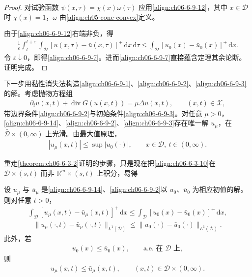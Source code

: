 \documentclass[../../main.tex]{subfiles}
\begin{document}
\begin{proof}
对试验函数 $\psi(x,\tau)=\chi(x)\omega(\tau)$ 应用\eqref{align:ch06-6-9-12}，其中 $x\in\mathscr{D}$ 时 $\chi(x)=1$，$\omega$ 由\eqref{align:ch05-cone-convex}定义。

由于\eqref{align:ch06-6-9-12}右端非负，得
\begin{align}
\frac{1}{\varepsilon}\int_{t}^{t+\varepsilon}\int_{\mathscr{D}}[u(x,\tau)-\bar{u}(x,\tau)]^{+}\,\mathrm{d}x\,\mathrm{d}\tau\leqslant\int_{\mathscr{D}}[u_{0}(x)-\bar{u}_{0}(x)]^{+}\,\mathrm{d}x.
\label{align:ch06-6-9-13}
\end{align}
令 $\varepsilon\downarrow 0$，即得\eqref{align:ch06-6-9-7}。进而\eqref{align:ch06-6-9-7}直接蕴含定理其余论断。证明完成。
\end{proof}

下一步用黏性消失法构造\eqref{align:ch06-6-9-1}、\eqref{align:ch06-6-9-2}、\eqref{align:ch06-6-9-3}的解。考虑抛物方程组
\begin{align}
\partial_{t}u(x,t)+\operatorname{div}G(u(x,t))=\mu\Delta u(x,t),\qquad (x,t)\in\mathscr{X},
\label{align:ch06-6-9-14}
\end{align}
带边界条件\eqref{align:ch06-6-9-2}与初始条件\eqref{align:ch06-6-9-3}。对任意 $\mu>0$，\eqref{align:ch06-6-9-14}、\eqref{align:ch06-6-9-2}、\eqref{align:ch06-6-9-3}存在唯一解 $u_{\mu}$，在 $\bar{\mathscr{D}}\times(0,\infty)$ 上光滑。由最大值原理，
\begin{align}
|u_{\mu}(x,t)|\leqslant\sup|u_{0}(\cdot)|,\qquad x\in\mathscr{D},\ t\in(0,\infty).
\label{align:ch06-6-9-15}
\end{align}

重走\cref{theorem:ch06-6-3-2}证明的步骤，只是现在把\eqref{align:ch06-6-3-10}在 $\mathscr{D}\times(s,t)$ 而非 $\mathbb{R}^{m}\times(s,t)$ 上积分，易得

\begin{theorem}\label{theorem:ch06-6-9-4}
设 $u_{\mu}$ 与 $\bar{u}_{\mu}$ 是\eqref{align:ch06-6-9-14}、\eqref{align:ch06-6-9-2}以 $u_{0}$、$\bar{u}_{0}$ 为相应初值的解。则对任意 $t>0$，
\begin{align}
\int_{\mathscr{D}}[u_{\mu}(x,t)-\bar{u}_{\mu}(x,t)]^{+}\,\mathrm{d}x\leqslant\int_{\mathscr{D}}[u_{0}(x)-\bar{u}_{0}(x)]^{+}\,\mathrm{d}x,
\label{align:ch06-6-9-16}
\end{align}
\begin{align}
\|u_{\mu}(\cdot,t)-\bar{u}_{\mu}(\cdot,t)\|_{L^{1}(\mathscr{D})}\leqslant\|u_{0}(\cdot)-\bar{u}_{0}(\cdot)\|_{L^{1}(\mathscr{D})}.
\label{align:ch06-6-9-17}
\end{align}
此外，若
\begin{align}
u_{0}(x)\leqslant\bar{u}_{0}(x),\qquad\text{a.e.\ 在 }\mathscr{D}\text{ 上},
\label{align:ch06-6-9-18}
\end{align}
则
\begin{align}
u_{\mu}(x,t)\leqslant\bar{u}_{\mu}(x,t),\qquad (x,t)\in\mathscr{D}\times(0,\infty).
\label{align:ch06-6-9-19}
\end{align}
\end{theorem}
\end{document}
